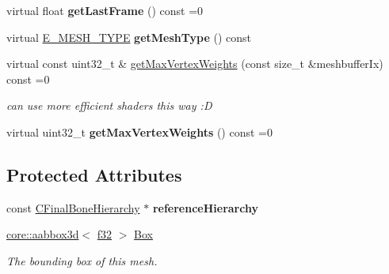 \begin{DoxyCompactItemize}
\item 
virtual float {\bfseries get\+Last\+Frame} () const  =0\hypertarget{classirr_1_1scene_1_1IGPUSkinnedMesh_ae8f69ffa9b586e4334c63655c650483b}{}\label{classirr_1_1scene_1_1IGPUSkinnedMesh_ae8f69ffa9b586e4334c63655c650483b}

\item 
virtual \hyperlink{namespaceirr_1_1scene_aef0400177e5941293dff6640e800d11b}{E\+\_\+\+M\+E\+S\+H\+\_\+\+T\+Y\+PE} {\bfseries get\+Mesh\+Type} () const \hypertarget{classirr_1_1scene_1_1IGPUSkinnedMesh_afcde74ebf49b3789a78a297dca93bf23}{}\label{classirr_1_1scene_1_1IGPUSkinnedMesh_afcde74ebf49b3789a78a297dca93bf23}

\item 
virtual const uint32\+\_\+t \& \hyperlink{classirr_1_1scene_1_1IGPUSkinnedMesh_a2b2779acd0213c9769237e216891b892}{get\+Max\+Vertex\+Weights} (const size\+\_\+t \&meshbuffer\+Ix) const  =0\hypertarget{classirr_1_1scene_1_1IGPUSkinnedMesh_a2b2779acd0213c9769237e216891b892}{}\label{classirr_1_1scene_1_1IGPUSkinnedMesh_a2b2779acd0213c9769237e216891b892}

\begin{DoxyCompactList}\small\item\em can use more efficient shaders this way \+:D \end{DoxyCompactList}\item 
virtual uint32\+\_\+t {\bfseries get\+Max\+Vertex\+Weights} () const  =0\hypertarget{classirr_1_1scene_1_1IGPUSkinnedMesh_aca93da90a67c3c2e5a783af739569d85}{}\label{classirr_1_1scene_1_1IGPUSkinnedMesh_aca93da90a67c3c2e5a783af739569d85}

\end{DoxyCompactItemize}
\subsection*{Protected Attributes}
\begin{DoxyCompactItemize}
\item 
const \hyperlink{classirr_1_1scene_1_1CFinalBoneHierarchy}{C\+Final\+Bone\+Hierarchy} $\ast$ {\bfseries reference\+Hierarchy}\hypertarget{classirr_1_1scene_1_1IGPUSkinnedMesh_a05574ad2f9284c6fb552d434bbcba6eb}{}\label{classirr_1_1scene_1_1IGPUSkinnedMesh_a05574ad2f9284c6fb552d434bbcba6eb}

\item 
\hyperlink{classirr_1_1core_1_1aabbox3d}{core\+::aabbox3d}$<$ \hyperlink{namespaceirr_a0277be98d67dc26ff93b1a6a1d086b07}{f32} $>$ \hyperlink{classirr_1_1scene_1_1IGPUSkinnedMesh_ae83749a4ab9aec4f98f2d16cc49e14f6}{Box}\hypertarget{classirr_1_1scene_1_1IGPUSkinnedMesh_ae83749a4ab9aec4f98f2d16cc49e14f6}{}\label{classirr_1_1scene_1_1IGPUSkinnedMesh_ae83749a4ab9aec4f98f2d16cc49e14f6}

\begin{DoxyCompactList}\small\item\em The bounding box of this mesh. \end{DoxyCompactList}\end{DoxyCompactItemize}
